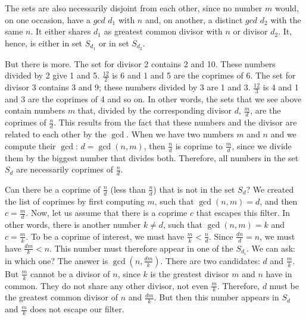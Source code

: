 \documentclass[tikz]{scrreprt}
\newcommand{\Varid}[1]{\mathit{#1}}
\begin{document}
The sets are also necessarily disjoint from each other,
since no number $m$ would, on one occasion,
have a \ensuremath{\Varid{gcd}} $d_1$ with $n$ and, on another,
a distinct \ensuremath{\Varid{gcd}} $d_2$ with the same $n$.
It either shares $d_1$ as greatest common divisor with $n$
or divisor $d_2$.
It, hence, is either in set $S_{d_1}$ or 
in set $S_{d_2}$.

But there is more. The set for divisor 2
contains 2 and 10. These numbers divided
by 2 give 1 and 5. $\frac{12}{2}$ is 6
and 1 and 5 are the coprimes of 6.
The set for divisor 3 contains 3 and 9;
these numbers divided by 3 are 1 and 3.
$\frac{12}{3}$ is 4 and 1 and 3 are the 
coprimes of 4 and so on. 
In other words, the sets that we see above
contain numbers $m$ that, divided by the corresponding
divisor $d$, $\frac{m}{d}$, are the coprimes
of $\frac{n}{d}$.
This results from the fact that these numbers
and the divisor are related to each other by the $\gcd$.
When we have two numbers $m$ and $n$ and we
compute their $\gcd$: $d = \gcd(n,m)$,
then $\frac{n}{d}$ is coprime to $\frac{m}{d}$,
since we divide them by the biggest number
that divides both.
Therefore, all numbers in the set $S_d$
are necessarily coprimes of $\frac{n}{d}$.

Can there be a coprime of $\frac{n}{d}$
(less than $\frac{n}{d}$)
that is not in the set $S_d$?
We created the list of coprimes by first computing
$m$, such that $\gcd(n,m) = d$, and then $c=\frac{m}{d}$.
Now, let us assume that there is a coprime $c$
that escapes this filter. In other words,
there is another number $k \neq d$, such that
$\gcd(n,m) = k$ and $c = \frac{m}{k}$.
To be a coprime of interest, we must have
$\frac{m}{k} < \frac{n}{d}$.
Since $\frac{dn}{d} = n$, we must have
$\frac{dm}{k} < n$. This number must therefore
appear in one of the $S_{d_i}$.
We can ask: in which one?
The answer is $\gcd(n,\frac{dm}{k})$.
There are two candidates: $d$ and $\frac{m}{k}$.
But $\frac{m}{k}$ cannot be a divisor of $n$,
since $k$ is the greatest divisor $m$ and $n$
have in common. They do not share any other divisor,
not even $\frac{m}{k}$. Therefore, $d$ must be
the greatest common divisor of $n$ and $\frac{dm}{k}$.
But then this number appears in $S_d$ and
$\frac{m}{k}$ does not escape our filter.
\end{document}
